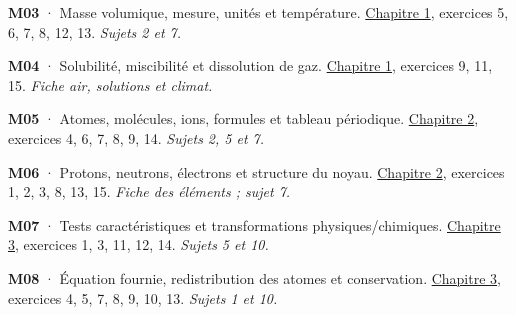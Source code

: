 \par\noindent\begin{minipage}{\linewidth}\textbf{M03} · Masse volumique, mesure, unités et température. \hyperref[chap-1]{Chapitre 1}, exercices 5, 6, 7, 8, 12, 13. \emph{Sujets 2 et 7.}\par\end{minipage}\par\vspace{2mm}
\par\noindent\begin{minipage}{\linewidth}\textbf{M04} · Solubilité, miscibilité et dissolution de gaz. \hyperref[chap-1]{Chapitre 1}, exercices 9, 11, 15. \emph{Fiche air, solutions et climat.}\par\end{minipage}\par\vspace{2mm}
\par\noindent\begin{minipage}{\linewidth}\textbf{M05} · Atomes, molécules, ions, formules et tableau périodique. \hyperref[chap-2]{Chapitre 2}, exercices 4, 6, 7, 8, 9, 14. \emph{Sujets 2, 5 et 7.}\par\end{minipage}\par\vspace{2mm}
\par\noindent\begin{minipage}{\linewidth}\textbf{M06} · Protons, neutrons, électrons et structure du noyau. \hyperref[chap-2]{Chapitre 2}, exercices 1, 2, 3, 8, 13, 15. \emph{Fiche des éléments ; sujet 7.}\par\end{minipage}\par\vspace{2mm}
\par\noindent\begin{minipage}{\linewidth}\textbf{M07} · Tests caractéristiques et transformations physiques/chimiques. \hyperref[chap-3]{Chapitre 3}, exercices 1, 3, 11, 12, 14. \emph{Sujets 5 et 10.}\par\end{minipage}\par\vspace{2mm}
\par\noindent\begin{minipage}{\linewidth}\textbf{M08} · Équation fournie, redistribution des atomes et conservation. \hyperref[chap-3]{Chapitre 3}, exercices 4, 5, 7, 8, 9, 10, 13. \emph{Sujets 1 et 10.}\par\end{minipage}\par\vspace{2mm}
